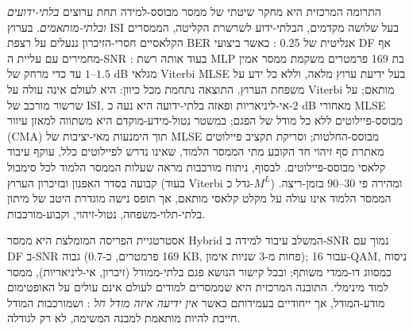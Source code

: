 \begin{otherlanguage}{hebrew}
\begin{flushright}
התרומה המרכזית היא מחקר שיטתי של ממסר מבוסס-למידה תחת ערוצים \emph{בלתי-ידועים ובלתי-מותאמים}. בערוץ ISI בעל שלושה מקדמים, הבלתי-ידוע לשרשרת הקליטה, הממסרים הקלאסיים חסרי-הזיכרון ננעלים על רצפת BER אנליטית של 0.25 : כאשר ביצועי DF אף מחמירים עם עליית ה-SNR : בעוד אותה רשת MLP בת 169 פרמטרים משקמת ממסר אמין עד כדי מרחק של $1$–$1.5$ dB מגלאי Viterbi MLSE בעל ידיעת ערוץ מלאה, וללא כל ידע על משפחת הערוץ. התוצאה נתחמת מכל כיוון: היא לעולם אינה עולה על Viterbi מותאם; על שרשור מורכב של ISI, אי-ליניאריות ופאזה בלתי-ידועה היא נעה כ-$2$ dB מאחורי MLSE מבוסס-פיילוטים ללא כל מודל של הפגם; במשטר נטול-מידע-מוקדם היא משתווה למאזן עיוור (CMA) תוך הימנעות מאי-יציבות של MLSE מבוסס-החלטות; וסריקת תקציב פיילוטים מאתרת סף זיהוי חד הקובע מתי הממסר הלמוד, שאינו נדרש לפיילוטים כלל, עוקף עיבוד קלאסי מבוסס-פיילוטים. לבסוף, ניתוח מורכבות מראה שעלות הממסר הלמוד לכל סימבול קבועה בסדר האפנון ובזיכרון הערוץ (בעוד Viterbi גדל כ-$M^{L}$) ומהירה פי $30$–$90$ בזמן-ריצה. הממסר הלמוד אינו עולה על מקלט קלאסי מותאם, אך תופס נישה מוגדרת היטב של מיתון בלתי-תלוי-משפחה, נטול-זיהוי, וקבוע-מורכבות.

אסטרטגיית הפריסה המומלצת היא ממסר Hybrid המשלב עיבוד למידה ב-SNR נמוך עם DF ב-SNR גבוה (169 פרמטרים, כ-0.7 KB, פחות מ-3 שניות אימון); עבור 16-QAM, ניסוח כמסווג דו-ממדי משותף; ובכל קישור הנושא פגם בלתי-ממודל (זיכרון, אי-ליניאריות), ממסר למוד מינימלי. התובנה המרכזית היא שממסרים למודים לעולם אינם עולים על האופטימום מודע-המודל, אך ייחודיים בעמידותם כאשר \emph{אין ידיעה איזה מודל חל} : ושמורכבות המודל חייבת להיות מותאמת למבנה המשימה, לא רק לגודלה.

\end{flushright}
\end{otherlanguage}
